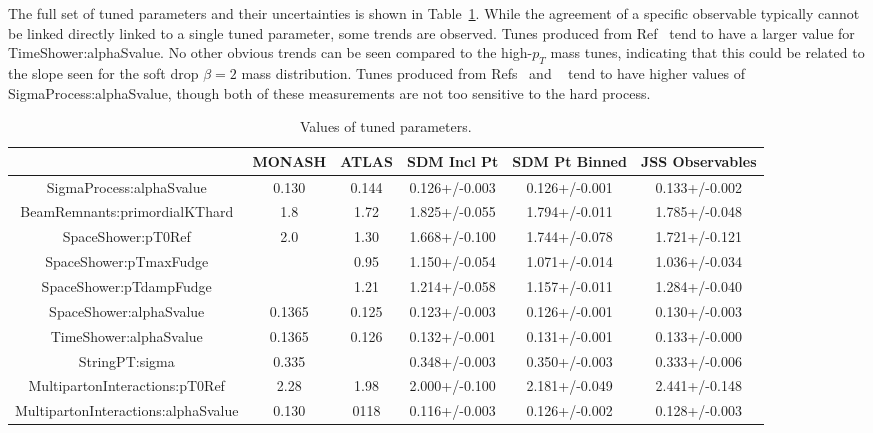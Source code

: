 The full set of tuned parameters and their uncertainties is shown in Table~\ref{tab:tuneResults}. 
While the agreement of a specific observable typically cannot be linked directly linked to a single tuned parameter, some trends are observed.
Tunes produced from Ref~\cite{softdropObs} tend to have a larger value for TimeShower:alphaSvalue. No other obvious trends can be seen compared to the high-$p_T$ mass tunes, 
indicating that this could be related to the slope seen for the soft drop $\beta=2$ mass distribution.
Tunes produced from Refs~\cite{softdropObs} and ~\cite{jssObs} tend to have higher values of SigmaProcess:alphaSvalue, though both of these measurements are not too sensitive to the hard process.


\clearpage
\begin{landscape}
\begin{table}[ht!]
\caption{Values of tuned parameters.}
\centering\begin{tabular}{ | c | | c | c | c | c | c |} \hline
                                     & MONASH   & ATLAS  & SDM Incl Pt   & SDM Pt Binned & JSS Observables  \\ \hline
SigmaProcess:alphaSvalue             &  0.130   & 0.144  & 0.126+/-0.003 & 0.126+/-0.001 & 0.133+/-0.002 \\ \hline
BeamRemnants:primordialKThard        &  1.8     & 1.72   & 1.825+/-0.055 & 1.794+/-0.011 & 1.785+/-0.048 \\ \hline
SpaceShower:pT0Ref                   &  2.0     & 1.30   & 1.668+/-0.100 & 1.744+/-0.078 & 1.721+/-0.121 \\ \hline
SpaceShower:pTmaxFudge               &          & 0.95   & 1.150+/-0.054 & 1.071+/-0.014 & 1.036+/-0.034 \\ \hline
SpaceShower:pTdampFudge              &          & 1.21   & 1.214+/-0.058 & 1.157+/-0.011 & 1.284+/-0.040 \\ \hline
SpaceShower:alphaSvalue              &  0.1365  & 0.125  & 0.123+/-0.003 & 0.126+/-0.001 & 0.130+/-0.003 \\ \hline
TimeShower:alphaSvalue               &  0.1365  & 0.126  & 0.132+/-0.001 & 0.131+/-0.001 & 0.133+/-0.000 \\ \hline
StringPT:sigma                       &  0.335   &        & 0.348+/-0.003 & 0.350+/-0.003 & 0.333+/-0.006 \\ \hline
MultipartonInteractions:pT0Ref       &  2.28    & 1.98   & 2.000+/-0.100 & 2.181+/-0.049 & 2.441+/-0.148 \\ \hline
MultipartonInteractions:alphaSvalue  &  0.130   & 0118   & 0.116+/-0.003 & 0.126+/-0.002 & 0.128+/-0.003 \\ \hline
\end{tabular}
\label{tab:tuneResults}
\end{table}\end{landscape}
\clearpage



